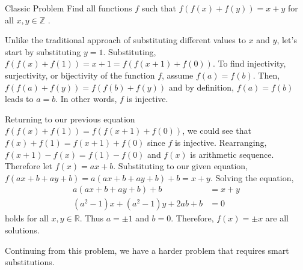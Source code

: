 \documentclass[../../../main.tex]{subfiles}
\begin{document}
\begin{problem}{Classic Problem \easy}{}
Find all functions $f$ such that $f(f(x) + f(y)) = x + y$ for all
$x, y \in \mathbb{Z}$ \cite{MATH01-5}.
\end{problem}
\begin{solution}
Unlike the traditional approach of substituting different values
to $x$ and $y$, let's start by substituting $y = 1$. Substituting,
$f(f(x) + f(1)) = x + 1 = f(f(x + 1) + f(0))$. To find injectivity,
surjectivity, or bijectivity of the function $f$, assume
$f(a) = f(b)$. Then, $f(f(a) + f(y)) = f(f(b) + f(y))$ and by
definition, $f(a) = f(b)$ leads to $a = b$. In other words,
$f$ is injective.

Returning to our previous equation $f(f(x) + f(1)) =
f(f(x + 1) + f(0))$, we could see that $f(x) + f(1) = f(x + 1) + f(0)$
since $f$ is injective. Rearranging, $f(x + 1) - f(x) = f(1) - f(0)$
and $f(x)$ is arithmetic sequence. Therefore let $f(x) = ax + b$.
Substituting to our given equation, $f(ax + b + ay + b) =
a (ax + b + ay + b) + b = x + y$. Solving the equation,
\begin{align*}
    a (ax + b + ay + b) + b &= x + y \\
    \left( a^2 - 1 \right) x + \left( a^2 - 1 \right) y
        + 2ab + b &= 0
\end{align*}
holds for all $x, y \in \mathbb{R}$. Thus $a = \pm 1$ and $b = 0$.
Therefore, $f(x) = \pm x$ are all solutions.
\end{solution}

Continuing from this problem, we have a harder problem that requires
smart substitutions.
\end{document}
